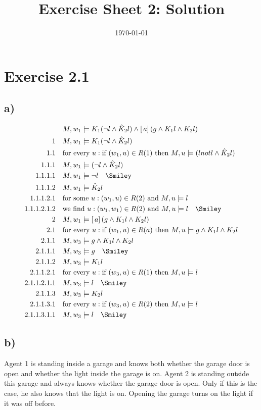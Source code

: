 \documentclass[a4paper]{article}
\begin{document}
\title{Exercise Sheet 2: Solution}
\author{}
\date{\today}
\section{Exercise 2.1}
\subsection{a)}
\begin{align*}
& M, w_1 \models K_1(\lnot l \land \hat K_2 l) \land [ \,a] \,(g \land K_1 l \land K_2 l)\\
\text{1}\quad & M, w_1 \models K_1(\lnot l \land \hat K_2 l)\\
\text{1.1}\quad & \text{for every } u: \text{if }(w_1, u) \in R(1) \text{ then } M, u \models (lnot l \land \hat K_2 l)\\
\text{1.1.1}\quad & M, w_1 \models (\lnot l \land \hat K_2 l)\\
\text{1.1.1.1}\quad & M, w_1 \models \lnot l \quad\text{\Smiley}\\
\text{1.1.1.2}\quad & M, w_1 \models \hat K_2 l\\
\text{1.1.1.2.1}\quad & \text{for some } u: (w_1, u) \in R(2) \text{ and } M, u \models l\\
\text{1.1.1.2.1.2}\quad & \text{we find } u: (w_1, w_1) \in R(2) \text{ and } M, u \models l \quad\text{\Smiley}\\
\text{2}\quad & M, w_1 \models [ \,a] \,(g \land K_1 l \land K_2 l)\\
\text{2.1}\quad & \text{for every } u: \text{if }(w_1, u) \in R(a) \text{ then } M, u \models g \land K_1 l \land K_2 l\\
\text{2.1.1}\quad & M, w_3 \models g \land K_1 l \land K_2 l\\
\text{2.1.1.1}\quad & M, w_3 \models g \quad\text{\Smiley}\\
\text{2.1.1.2}\quad & M, w_3 \models K_1 l\\
\text{2.1.1.2.1}\quad & \text{for every } u: \text{if }(w_3, u) \in R(1) \text{ then } M, u \models l\\
\text{2.1.1.2.1.1}\quad & M, w_3 \models l \quad\text{\Smiley}\\
\text{2.1.1.3}\quad & M, w_3 \models K_2 l\\
\text{2.1.1.3.1}\quad & \text{for every } u: \text{if }(w_3, u) \in R(2) \text{ then } M, u \models l\\
\text{2.1.1.3.1.1}\quad & M, w_3 \models l \quad\text{\Smiley}\\
\end{align*}
\subsection{b)}
Agent 1 is standing inside a garage and knows both whether the garage door is open and whether the light inside the garage is on. Agent 2 is standing outside this garage and always knows whether the garage door is open. Only if this is the case, he also knows that the light is on. Opening the garage turns on the light if it was off before. 
\end{document}
